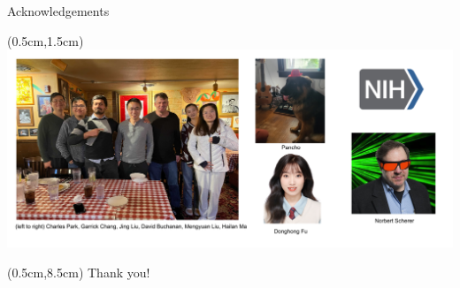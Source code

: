 \documentclass{beamer}					%
\begin{document}
\begin{frame}{Acknowledgements}
\begin{textblock*}{14cm}(0.5cm,1.5cm)
\includegraphics[width=14cm]{media/Lab.png}
\end{textblock*}

\begin{textblock*}{14cm}(0.5cm,8.5cm)
Thank you!
\end{textblock*}

\end{frame}
\end{document}
